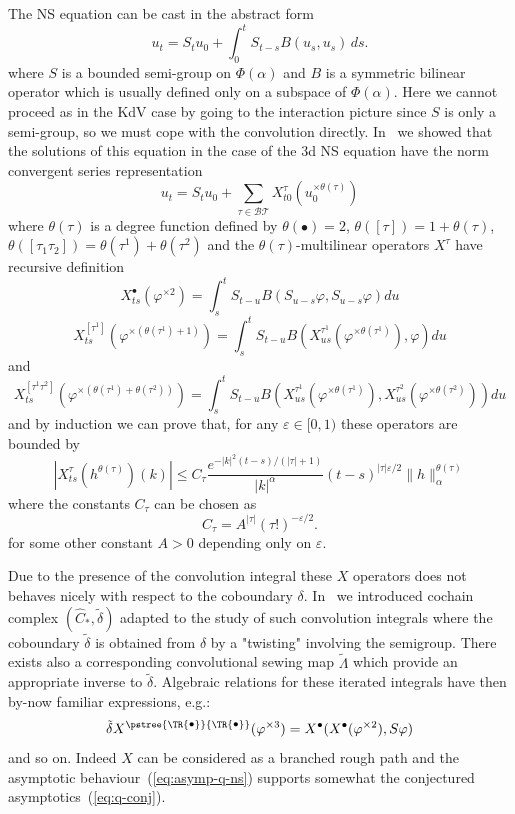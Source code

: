 \documentclass[a4paper]{article}
\newcommand{\1}{{\bf 1}}
\newcommand{\eps}{\varepsilon}
\newcommand{\der}{\delta}
\newcommand{\BT}{\mathcal{BT}}
\newcommand{\troot}{\bullet}
\newcommand{\tsnode}{\TR{\raisebox{0.5pt}{\ensuremath{\scriptstyle\bullet}}}}
\newcommand{\tsroot}{\ensuremath{\scriptstyle\bullet}}
\newcommand{\aabb}{\pstree{\tsnode}{\tsnode}}
\newcommand{\eps}{\varepsilon}
\newcommand{\der}{\delta}
\begin{document}
\bigskip
The NS equation can be cast in the abstract form
\begin{equation}
  \label{eq:NS-c-abstract}
u_t = S_t u_0 +  \int_0^t S_{t-s}  B(u_s,u_s)\,ds.
\end{equation}
where $S$ is a bounded semi-group on $\Phi(\alpha)$ and $B$ is a
symmetric bilinear operator which is usually defined only on a
subspace of $\Phi(\alpha)$. 
 Here we cannot proceed as in the KdV case by going to the interaction
 picture since $S$ is only a semi-group, so we must cope with
the convolution directly. 
In~\cite{MR2227041} we showed that the solutions of this equation in the case of the 3d NS equation have
the norm convergent series representation
\begin{equation}
  \label{eq:ns-series}
u_t = S_t u_0 + \sum_{\tau \in \BT} X^{\tau}_{t0}(u_0^{\times \theta(\tau)})   
\end{equation}
where $\theta(\tau)$ is a degree function defined by $
\theta(\troot) = 2$, $\theta([\tau]) = 1+ \theta(\tau)$, $
\theta([\tau_1 \tau_2]) = \theta(\tau^1) + \theta(\tau^2)  
$ and the $\theta(\tau)$-multilinear operators
$X^{\tau}$ have recursive definition
$$
X^{\tsroot}_{ts} (\varphi^{\times 2}) = \int_s^t S_{t-u}
B(S_{u-s}\varphi,S_{u-s}\varphi) du
$$
$$
X^{[\tau^1]}_{ts}(\varphi^{\times (\theta(\tau^1)+1)}) = \int_s^t
S_{t-u}B(X^{\tau^1}_{us}(\varphi^{\times \theta(\tau^1)}),\varphi) du
$$
and
$$
X^{[\tau^1 \tau^2]}_{ts}(\varphi^{\times (\theta(\tau^1)+\theta(\tau^2))}) = \int_s^t
S_{t-u}B(X^{\tau^1}_{us}(\varphi^{\times \theta(\tau^1)}),X^{\tau^2}_{us}(\varphi^{\times \theta(\tau^2)})) du
$$
and by induction we can prove that, for any $\eps \in [0,1)$ these
operators are bounded by
\begin{equation}
\label{eq:bounds-NS}
|X^\tau_{ts}(h^{\theta(\tau)})(k)| \le C_{\tau} \frac{e^{-|k|^2 (t-s) / (|\tau|+1)}}{|k|^\alpha}
(t-s)^{|\tau| \eps /2} \|h\|_\alpha^{\theta(\tau)}  
\end{equation}
where the constants $C_{\tau}$ can be chosen as 
\begin{equation}
  \label{eq:asymp-q-ns}
C_\tau = A^{|\tau|} (\tau!)^{-\eps/2}.  
\end{equation}
for some other constant $A > 0$ depending only on $\eps$.

Due to the presence of the convolution integral these $X$ operators
does not behaves nicely with respect to
the coboundary $\der$. In~\cite{TindelGubinelli} we introduced cochain complex $(\hat
C_*,\tilde \der)$ adapted to the study of such convolution integrals
where the coboundary $\tilde \der$ is obtained from $\der$ by a "twisting" involving the semigroup.
 There exists also a corresponding convolutional sewing map $\tilde
\Lambda$ which
provide an appropriate inverse to $\tilde \der$. Algebraic relations for
these iterated integrals have then  by-now familiar expressions, e.g.:
$$
\tilde \der X^{\aabb}(\varphi^{\times 3}) =
X^{\tsroot}(X^{\tsroot}(\varphi^{\times 2}), S\varphi) 
$$
and so on. Indeed $X$ can be considered as a branched rough path and
the asymptotic behaviour~(\ref{eq:asymp-q-ns}) supports somewhat the
conjectured asymptotics~(\ref{eq:q-conj}).
\end{document}
